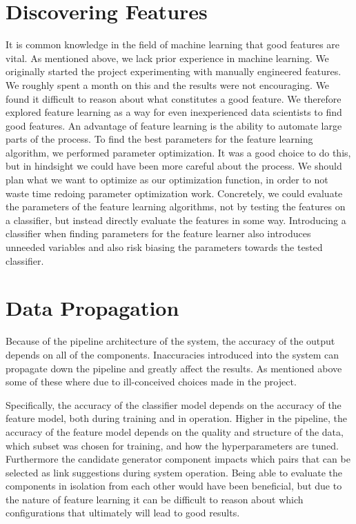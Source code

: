 \section{Discovering Features}
It is common knowledge in the field of machine learning that good features are vital. As mentioned above, we lack prior experience in machine learning. We originally started the project experimenting with manually engineered features. We roughly spent a month on this and the results were not encouraging. We found it difficult to reason about what constitutes a good feature. We therefore explored feature learning as a way for even inexperienced data scientists to find good features. An advantage of feature learning is the ability to automate large parts of the process. To find the best parameters for the feature learning algorithm, we performed parameter optimization. It was a good choice to do this, but in hindsight we could have been more careful about the process. We should plan what we want to optimize as our optimization function, in order to not waste time redoing parameter optimization work. Concretely, we could evaluate the parameters of the feature learning algorithms, not by testing the features on a classifier, but instead directly evaluate the features in some way. Introducing a classifier when finding parameters for the feature learner also introduces unneeded variables and also risk biasing the parameters towards the tested classifier.

\section{Data Propagation}
Because of the pipeline architecture of the system, the accuracy of the output depends on all of the components.
Inaccuracies introduced into the system can propagate down the pipeline and greatly affect the results. As mentioned above some of these where due to ill-conceived choices made in the project. 

Specifically, the accuracy of the classifier model depends on the accuracy of the feature model, both during training and in operation. Higher in the pipeline, the accuracy of the feature model depends on the quality and structure of the data, which subset was chosen for training, and how the hyperparameters are tuned. Furthermore the candidate generator component impacts which pairs that can be selected as link suggestions during system operation.
Being able to evaluate the components in isolation from each other would have been beneficial, but due to the nature of feature learning it can be difficult to reason about which configurations that ultimately will lead to good results.


